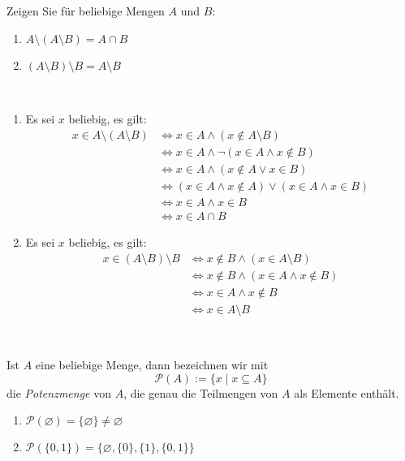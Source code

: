 \begin{ueb}
Zeigen Sie für beliebige Mengen $A$ und $B$:
\begin{enumerate}
\item $A\setminus(A\setminus B)=A\cap B$
\item $(A\setminus B)\setminus B=A\setminus B$
\end{enumerate}
\end{ueb}
\begin{lsg}
{~
	\begin{enumerate}
	\item Es sei $x$ beliebig, es gilt:
	\begin{align*}
	x\in A\setminus (A\setminus B)&\Leftrightarrow x\in A\land (x\notin A\setminus B)\\
	&\Leftrightarrow x\in A\land \neg(x\in A\land x\notin B)\\
	&\Leftrightarrow x\in A\land (x\notin A\lor x\in B)\\
	&\Leftrightarrow (x\in A\land x\notin A)\lor (x\in A\land x\in B)\\
	&\Leftrightarrow x\in A\land x\in B\\
	&\Leftrightarrow x\in A\cap B
	\end{align*}
	\item Es sei $x$ beliebig, es gilt:
	\begin{align*}
	x\in (A\setminus B)\setminus B&\Leftrightarrow x\notin B\land (x\in A\setminus B)\\
	&\Leftrightarrow x\notin B\land (x\in A\land x\notin B)\\
	&\Leftrightarrow x\in A\land x\notin B\\
	&\Leftrightarrow x\in A\setminus B
	\end{align*}
	\end{enumerate}
}
{~
	\answerspace{8cm}
}
\end{lsg}

\begin{df}
Ist $A$ eine beliebige Menge, dann bezeichnen wir mit
\[
 \mathcal{P}(A):=\{x\mid x\subseteq A\}
\]
die \textit{Potenzmenge} von $A$, die genau die Teilmengen von $A$ als Elemente enthält.
\end{df}



\begin{bsp}
\begin{enumerate}
\item $\mathcal{P}(\varnothing)=\{\varnothing\}\neq \varnothing$
\item $\mathcal{P}(\{0,1\})=\big\{ \varnothing,\{0\},\{1\},\{0,1\} \big\}$
\end{enumerate}
\end{bsp}

